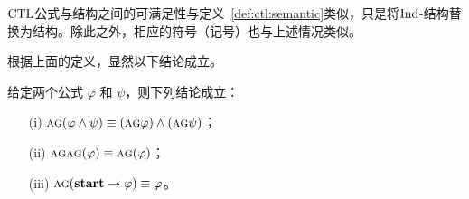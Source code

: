$\textrm{CTL}$公式与结构之间的可满足性与定义~\ref{def:ctl:semantic}类似，只是将$\textrm{Ind}$-结构替换为结构。除此之外，相应的符号（记号）也与上述情况类似。

根据上面的定义，显然以下结论成立。
\begin{lemma} \label{lem:equivAG}
	给定两个公式 $\varphi$ 和 $\psi$，则下列结论成立：
	\begin{itemize}
		\item[(i)] $\textsc{a}\textsc{g} (\varphi\land\psi)\equiv (\textsc{a}\textsc{g} \varphi) \land (\textsc{a}\textsc{g}\psi)$；
		\item[(ii)] $\textsc{a}\textsc{g} \textsc{a}\textsc{g} (\varphi)\equiv \textsc{a}\textsc{g} (\varphi)$；
		\item[(iii)] $\textsc{a}\textsc{g} (\textbf{start} \rightarrow\varphi)\equiv \varphi$。
	\end{itemize}
\end{lemma}
%	
%	
%
